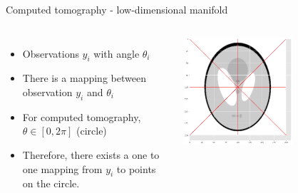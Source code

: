 \documentclass[aspectratio=169]{beamer}
\begin{document}
\begin{frame}[c]{Computed tomography - low-dimensional manifold}
    \begin{columns}
        \begin{itemize}
            \item Observations $y_i$  with angle $\theta_i$
            \item There is a mapping between observation $y_i$ and $\theta_i$
            \item For computed tomography, $\theta \in [0, 2\pi]$ (circle)
            \item Therefore, there exists a one to one mapping from $y_i$ to points on the circle.
        \end{itemize}
        
        \includegraphics[width=0.6\textwidth]{phantom_many_theta.png}
        
    \end{columns}
\end{frame}
\end{document}
